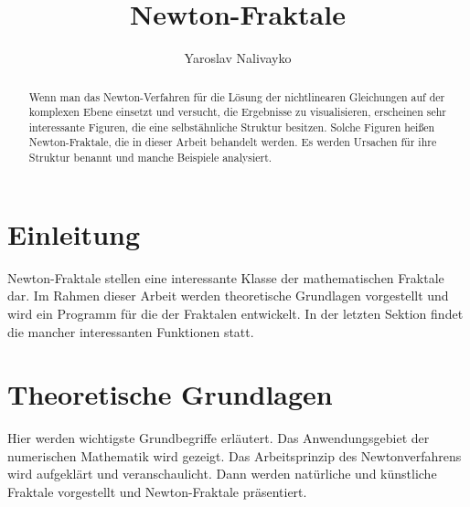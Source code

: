 \documentclass[a4paper,12pt]{llncs}
\numberwithin{equation}{section}
\begin{document}


\author{Yaroslav Nalivayko}

\title{Newton-Fraktale}

\maketitle

\thispagestyle{empty}

\begin{abstract}
Wenn man das Newton-Verfahren für die Lösung der nichtlinearen Gleichungen auf der komplexen Ebene einsetzt und versucht, die Ergebnisse zu visualisieren, erscheinen sehr interessante Figuren, die eine selbstähnliche Struktur besitzen.
Solche Figuren heißen Newton-Fraktale, die in dieser Arbeit behandelt werden.
Es werden Ursachen für ihre Struktur benannt und manche Beispiele analysiert. 
\end{abstract}

\section{Einleitung}
Newton-Fraktale stellen eine interessante Klasse der mathematischen Fraktale dar. 
Im Rahmen dieser Arbeit werden theoretische Grundlagen vorgestellt und wird ein Programm für die  der Fraktalen entwickelt.
In der letzten Sektion findet die  mancher interessanten Funktionen statt.


\section{Theoretische Grundlagen}\label{sec:theo}
Hier werden wichtigste Grundbegriffe erläutert. 
Das Anwendungsgebiet der numerischen Mathematik wird gezeigt.
Das Arbeitsprinzip des Newtonverfahrens wird aufgeklärt und veranschaulicht.
Dann werden natürliche und künstliche Fraktale vorgestellt und Newton-Fraktale präsentiert.
\end{document}
